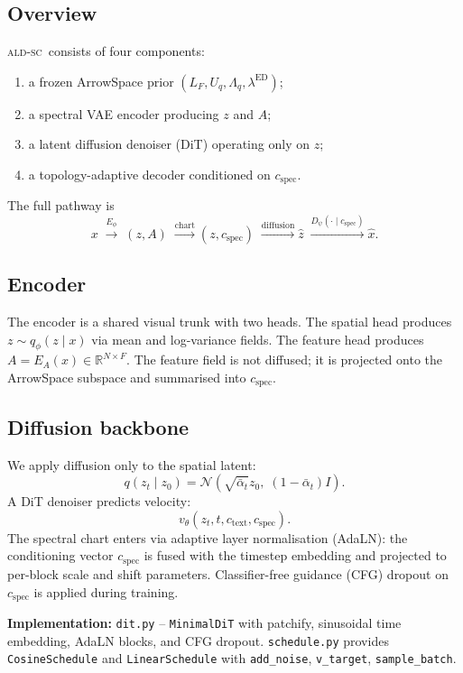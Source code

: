 \documentclass[11pt]{article}
\newcommand{\ALDSC}{\textsc{ald-sc}}
\newcommand{\Lf}{L_F}
\newcommand{\Uq}{U_q}
\newcommand{\Lq}{\Lambda_q}
\newcommand{\ed}{\lambda^{\mathrm{ED}}}
\newcommand{\R}{\mathbb{R}}
\begin{document}
    \subsection{Overview}
    \label{sec:overview}
    \ALDSC~consists of four components:
    \begin{enumerate}[leftmargin=1.5em]
    \item a frozen ArrowSpace prior $(\Lf,\Uq,\Lq,\ed)$;
    \item a spectral VAE encoder producing $z$ and $A$;
    \item a latent diffusion denoiser (DiT) operating only on $z$;
    \item a topology-adaptive decoder conditioned on $c_{\mathrm{spec}}$.
    \end{enumerate}
    The full pathway is
    \[x \;\xrightarrow{E_\phi}\; (z, A) \;\xrightarrow{\text{chart}}
    (z, c_{\mathrm{spec}}) \;\xrightarrow{\text{diffusion}} \hat z
    \;\xrightarrow{D_\psi(\cdot \mid c_{\mathrm{spec}})} \hat x.\]

    \subsection{Encoder}
    \label{sec:encoder}
    The encoder is a shared visual trunk with two heads. The spatial
    head produces $z \sim q_\phi(z \mid x)$ via mean and log-variance
    fields. The feature head produces $A = E_A(x) \in \R^{N \times F}$.
    The feature field is not diffused; it is projected onto the
    ArrowSpace subspace and summarised into $c_{\mathrm{spec}}$.

    \subsection{Diffusion backbone}
    \label{sec:backbone}
    We apply diffusion only to the spatial latent:
    \[q(z_t \mid z_0) = \mathcal{N}(\sqrt{\bar\alpha_t} z_0,\;
    (1-\bar\alpha_t)I).\]
    A DiT denoiser predicts velocity:
    \[v_\theta(z_t, t, c_{\mathrm{text}}, c_{\mathrm{spec}}).\]
    The spectral chart enters via adaptive layer normalisation
    (AdaLN): the conditioning vector $c_{\mathrm{spec}}$ is fused with
    the timestep embedding and projected to per-block scale and shift
    parameters. Classifier-free guidance (CFG) dropout on
    $c_{\mathrm{spec}}$ is applied during training.

    \noindent\textbf{Implementation:} \texttt{dit.py} --
    \texttt{MinimalDiT} with patchify, sinusoidal time embedding, AdaLN
    blocks, and CFG dropout. \texttt{schedule.py} provides
    \texttt{CosineSchedule} and \texttt{LinearSchedule} with
    \texttt{add\_noise}, \texttt{v\_target}, \texttt{sample\_batch}.
\end{document}
